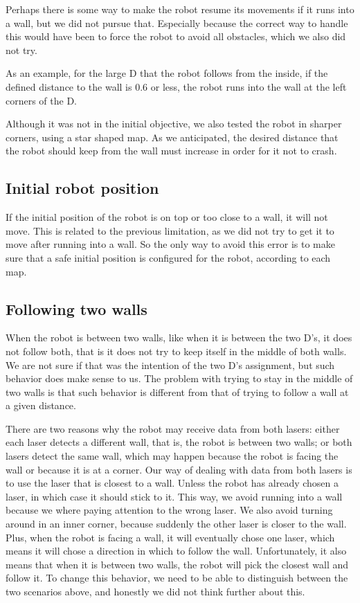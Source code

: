 \documentclass[10pt,journal,compsoc]{IEEEtran}
\begin{document}
Perhaps there is some way to make the robot resume its movements if it runs into a wall, but we did not pursue that. Especially because the correct way to handle this would have been to force the robot to avoid all obstacles, which we also did not try.

As an example, for the large D that the robot follows from the inside, if the defined distance to the wall is 0.6 or less, the robot runs into the wall at the left corners of the D.

Although it was not in the initial objective, we also tested the robot in sharper corners, using a star shaped map. As we anticipated, the desired distance that the robot should keep from the wall must increase in order for it not to crash.

\subsection{Initial robot position}

If the initial position of the robot is on top or too close to a wall, it will not move. This is related to the previous limitation, as we did not try to get it to move after running into a wall. So the only way to avoid this error is to make sure that a safe initial position is configured for the robot, according to each map.

\subsection{Following two walls}

When the robot is between two walls, like when it is between the two D's, it does not follow both, that is it does not try to keep itself in the middle of both walls. We are not sure if that was the intention of the two D's assignment, but such behavior does make sense to us. The problem with trying to stay in the middle of two walls is that such behavior is different from that of trying to follow a wall at a given distance. 

There are two reasons why the robot may receive data from both lasers: either each laser detects a different wall, that is, the robot is between two walls; or both lasers detect the same wall, which may happen because the robot is facing the wall or because it is at a corner. Our way of dealing with data from both lasers is to use the laser that is closest to a wall. Unless the robot has already chosen a laser, in which case it should stick to it. This way, we avoid running into a wall because we where paying attention to the wrong laser. We also avoid turning around in an inner corner, because suddenly the other laser is closer to the wall. Plus, when the robot is facing a wall, it will eventually chose one laser, which means it will chose a direction in which to follow the wall. Unfortunately, it also means that when it is between two walls, the robot will pick the closest wall and follow it. To change this behavior, we need to be able to distinguish between the two scenarios above, and honestly we did not think further about this.
\end{document}

